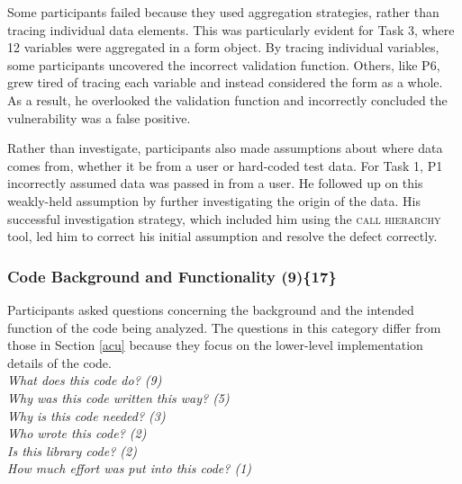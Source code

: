 \documentclass[10pt,journal,compsoc]{IEEEtran}
\begin{document}
Some participants failed because they used aggregation strategies, rather than tracing individual data elements.
This was particularly evident for Task 3, where 12 variables were aggregated in a form object.
By tracing individual variables, some participants uncovered the incorrect validation function. 
Others, like P6, grew tired of tracing each variable and instead considered the form as a whole.
As a result, he overlooked the validation function and incorrectly concluded the vulnerability was a false positive.

Rather than investigate, participants also made assumptions about where data comes from, whether it be from a user or hard-coded test data.
For Task 1, P1 incorrectly assumed data was passed in from a user.
He followed up on this weakly-held assumption by further investigating the origin of the data.
His successful investigation strategy, which included him using the \textsc{call hierarchy} tool, led him to correct his initial assumption and resolve the defect correctly.


%
%	
%



\subsubsection{Code Background and Functionality (9)\{17\}}

\label{cbf}
Participants asked questions concerning the background and the intended function of the code being analyzed. 
The questions in this category differ from those in Section \ref{acu} because they focus on the lower-level implementation details of the code.
\\

\noindent\emph{What does this code do? (9)} \\
\emph{Why was this code written this way? (5)} \\
\emph{Why is this code needed? (3)} \\
\emph{Who wrote this code? (2)} \\
\emph{Is this library code? (2)} \\
\emph{How much effort was put into this code? (1)}
\\
\end{document}
